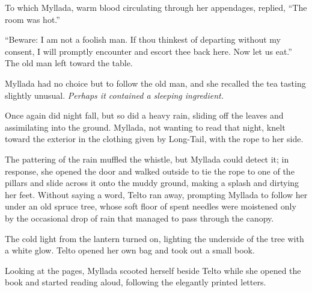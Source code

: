 To which Myllada, warm blood circulating through her appendages, replied, ``The room was hot.''

``Beware: I am not a foolish man. If thou thinkest of departing without my consent, I will promptly encounter and escort thee back here. Now let us eat.'' The old man left toward the table.

Myllada had no choice but to follow the old man, and she recalled the tea tasting slightly unusual. \emph{Perhaps it contained a sleeping ingredient.}

\centeredstars

Once again did night fall, but so did a heavy rain, sliding off the leaves and assimilating into the ground. Myllada, not wanting to read that night, knelt toward the exterior in the clothing given by Long-Tail, with the rope to her side.

The pattering of the rain muffled the whistle, but Myllada could detect it; in response, she opened the door and walked outside to tie the rope to one of the pillars and slide across it onto the muddy ground, making a splash and dirtying her feet. Without saying a word, Telto ran away, prompting Myllada to follow her under an old spruce tree, whose soft floor of spent needles were moistened only by the occasional drop of rain that managed to pass through the canopy.

The cold light from the lantern turned on, lighting the underside of the tree with a white glow. Telto opened her own bag and took out a small book.

Looking at the pages, Myllada scooted herself beside Telto while she opened the book and started reading aloud, following the elegantly printed letters.

